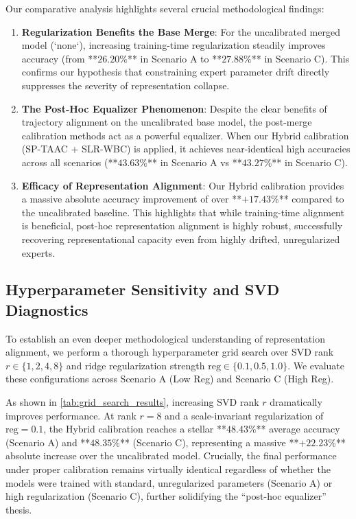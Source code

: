 \documentclass{article}
\theoremstyle{plain}
\theoremstyle{definition}
\theoremstyle{remark}
\begin{document}
Our comparative analysis highlights several crucial methodological findings:
\begin{enumerate}\itemsep=0pt \parsep=0pt
    \item \textbf{Regularization Benefits the Base Merge}: For the uncalibrated merged model (`none`), increasing training-time regularization steadily improves accuracy (from **$26.20\%$** in Scenario A to **$27.88\%$** in Scenario C). This confirms our hypothesis that constraining expert parameter drift directly suppresses the severity of representation collapse.
    \item \textbf{The Post-Hoc Equalizer Phenomenon}: Despite the clear benefits of trajectory alignment on the uncalibrated base model, the post-merge calibration methods act as a powerful equalizer. When our Hybrid calibration (SP-TAAC + SLR-WBC) is applied, it achieves near-identical high accuracies across all scenarios (**$43.63\%$** in Scenario A vs **$43.27\%$** in Scenario C).
    \item \textbf{Efficacy of Representation Alignment}: Our Hybrid calibration provides a massive absolute accuracy improvement of over **$+17.43\%$** compared to the uncalibrated baseline. This highlights that while training-time alignment is beneficial, post-hoc representation alignment is highly robust, successfully recovering representational capacity even from highly drifted, unregularized experts.
\end{enumerate}

\subsection{Hyperparameter Sensitivity and SVD Diagnostics}
To establish an even deeper methodological understanding of representation alignment, we perform a thorough hyperparameter grid search over SVD rank $r \in \{1, 2, 4, 8\}$ and ridge regularization strength $\text{reg} \in \{0.1, 0.5, 1.0\}$. We evaluate these configurations across Scenario A (Low Reg) and Scenario C (High Reg). 

As shown in \cref{tab:grid_search_results}, increasing SVD rank $r$ dramatically improves performance. At rank $r=8$ and a scale-invariant regularization of $\text{reg}=0.1$, the Hybrid calibration reaches a stellar **$48.43\%$** average accuracy (Scenario A) and **$48.35\%$** (Scenario C), representing a massive **$+22.23\%$** absolute increase over the uncalibrated model. Crucially, the final performance under proper calibration remains virtually identical regardless of whether the models were trained with standard, unregularized parameters (Scenario A) or high regularization (Scenario C), further solidifying the ``post-hoc equalizer'' thesis.
\end{document}
